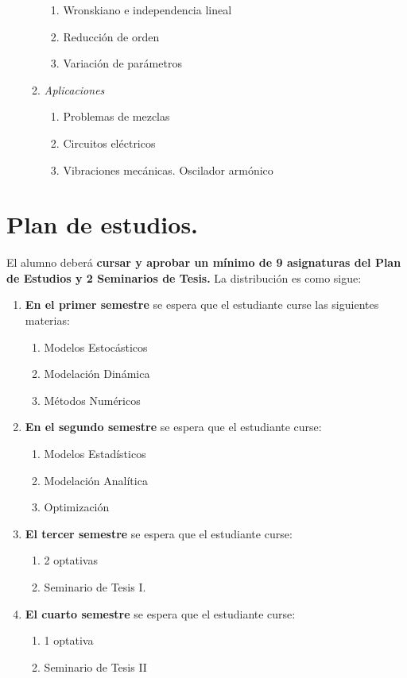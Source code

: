 \documentclass[10pt,a4paper]{article}
\begin{document}
\begin{enumerate}
\begin{enumerate}
\begin{enumerate}
			\item Wronskiano e independencia lineal
			\item Reducción de orden
			\item Variación de parámetros
		\end{enumerate}
		\item \textit{Aplicaciones}
		\begin{enumerate}
			\item Problemas de mezclas
			\item Circuitos eléctricos
			\item Vibraciones mecánicas. Oscilador armónico
		\end{enumerate}
	\end{enumerate}
\end{enumerate}
\newpage
\section{Plan de estudios.}
El alumno deberá \textbf{cursar y aprobar un mínimo de 9 asignaturas del Plan de Estudios y 2 Seminarios de Tesis.} La distribución es como sigue:
\begin{enumerate}
	\item \textbf{En el primer semestre} se espera que el estudiante curse las siguientes materias:
	\begin{enumerate}
		\item Modelos Estocásticos
		\item Modelación Dinámica
		\item Métodos Numéricos
	\end{enumerate}	
	\item \textbf{En el segundo semestre} se espera que el estudiante curse:
	\begin{enumerate}
		\item Modelos Estadísticos
		\item Modelación Analítica
		\item Optimización
	\end{enumerate}
	\item \textbf{El tercer semestre} se espera que el estudiante curse:
	\begin{enumerate}
		\item 2 optativas
		\item Seminario de Tesis I.	
	\end{enumerate}
	\item \textbf{El cuarto semestre} se espera que el estudiante curse:
	\begin{enumerate}
		\item 1 optativa
		\item Seminario de Tesis II
	\end{enumerate}	
\end{enumerate}
\end{document}
